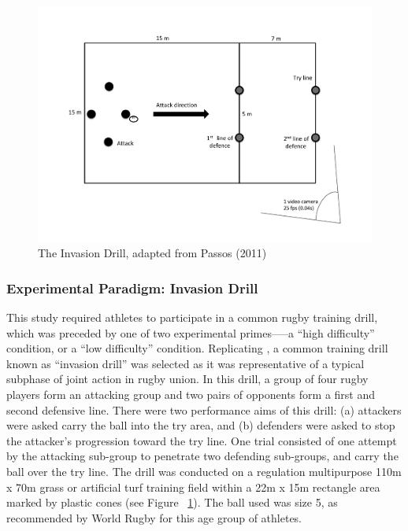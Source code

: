 \begin{figure}[htbp]
  \centering
      \includegraphics[width=0.9\linewidth,keepaspectratio] {images/invasionDrill}
      \caption{The Invasion Drill, adapted from Passos (2011)}
      \label{fig:invasionDrill}
  \end{figure}


\subsubsection{Experimental Paradigm: Invasion Drill}
This study required athletes to participate in a common rugby training drill, which was preceded by one of two experimental primes—--a ``high difficulty'' condition, or a ``low difficulty'' condition.   Replicating \textcite{Passos2011}, a common training drill known as ``invasion drill'' \citep{Biscombe1998} was selected as it was representative of a typical subphase of joint action in rugby union.
In this drill, a group of four rugby players form an attacking group and two pairs of opponents form a first and second defensive line.  There were two performance aims of this drill: (a) attackers were asked carry the ball into the try area, and (b) defenders were asked to stop the attacker’s progression toward the try line.
One trial consisted of one attempt by the attacking sub-group to penetrate two defending sub-groups, and carry the ball over the try line. The drill was conducted on a regulation multipurpose 110m x 70m grass or artificial turf training field within a 22m x 15m rectangle area marked by plastic cones (see Figure ~\ref{fig:invasionDrill}). The ball used was size 5, as recommended by World Rugby for this age group of athletes.




